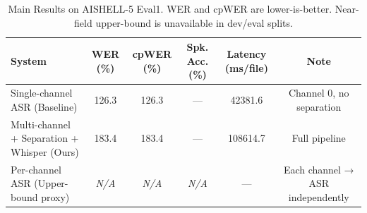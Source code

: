 \begin{table}[h]
\centering
\caption{Main Results on AISHELL-5 Eval1. WER and cpWER are lower-is-better. Near-field upper-bound is unavailable in dev/eval splits.}
\label{tab:main_results}
\begin{tabular}{lccccc}
\toprule
\textbf{System} & \textbf{WER (\%)} & \textbf{cpWER (\%)} & \textbf{Spk. Acc. (\%)} & \textbf{Latency (ms/file)} & \textbf{Note} \\
\midrule
Single-channel ASR (Baseline) & 126.3 & 126.3 & — & 42381.6 & Channel 0, no separation \\
Multi-channel + Separation + Whisper (Ours) & 183.4 & 183.4 & — & 108614.7 & Full pipeline \\
Per-channel ASR (Upper-bound proxy) & \textit{N/A} & \textit{N/A} & \textit{N/A} & — & Each channel → ASR independently \\
\bottomrule
\end{tabular}
\end{table}
